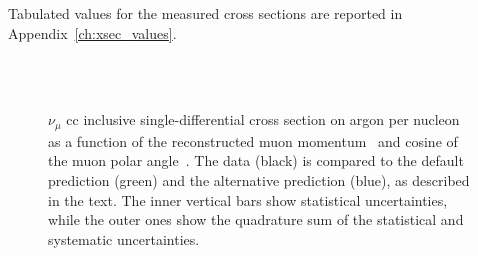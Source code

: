 Tabulated values for the measured cross sections are reported in Appendix~\ref{ch:xsec_values}.

\begin{figure}[]
\centering
{}\\
 \\
\caption[Single-Differential Cross Sections (Stat. $\oplus$ Syst. Unc.)]{$\nu_\mu$ \acrshort{cc} inclusive single-differential cross section on argon per nucleon as a function of the reconstructed muon momentum~\protect{} and cosine of the muon polar angle~\protect{}. The data (black) is compared to the default \g prediction (green) and the alternative \g prediction (blue), as described in the text.  The inner vertical bars show statistical uncertainties, while the outer ones show the quadrature sum of the statistical and systematic uncertainties.}
\label{fig:xsec_wsyst}
\end{figure}

